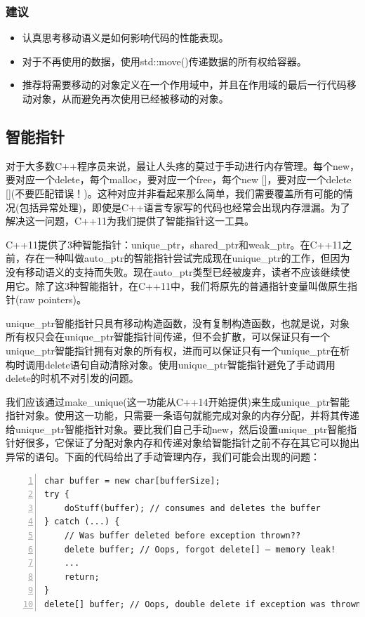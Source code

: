 \documentclass{ctexart}
\begin{document}
\subsubsection*{建议}
\begin{itemize}
	\item 认真思考移动语义是如何影响代码的性能表现。
	\item 对于不再使用的数据，使用std::move()传递数据的所有权给容器。
	\item 推荐将需要移动的对象定义在一个作用域中，并且在作用域的最后一行代码移动对象，从而避免再次使用已经被移动的对象。
\end{itemize}

\subsection{智能指针}

对于大多数C++程序员来说，最让人头疼的莫过于手动进行内存管理。每个new，要对应一个delete，每个malloc，要对应一个free，每个new []，要对应一个delete [](不要匹配错误！)。这种对应并非看起来那么简单，我们需要覆盖所有可能的情况(包括异常处理)，即使是C++语言专家写的代码也经常会出现内存泄漏。为了解决这一问题，C++11为我们提供了智能指针这一工具。

C++11提供了3种智能指针：unique\_ptr，shared\_ptr和weak\_ptr。在C++11之前，存在一种叫做auto\_ptr的智能指针尝试完成现在unique\_ptr的工作，但因为没有移动语义的支持而失败。现在auto\_ptr类型已经被废弃，读者不应该继续使用它。除了这3种智能指针，在C++11中，我们将原先的普通指针变量叫做原生指针(raw pointers)。

unique\_ptr智能指针只具有移动构造函数，没有复制构造函数，也就是说，对象所有权只会在unique\_ptr智能指针间传递，但不会扩散，可以保证只有一个unique\_ptr智能指针拥有对象的所有权，进而可以保证只有一个unique\_ptr在析构时调用delete语句自动清除对象。使用unique\_ptr智能指针避免了手动调用delete的时机不对引发的问题。

我们应该通过make\_unique(这一功能从C++14开始提供)来生成unique\_ptr智能指针对象。使用这一功能，只需要一条语句就能完成对象的内存分配，并将其传递给unique\_ptr智能指针对象。要比我们自己手动new，然后设置unique\_ptr智能指针好很多，它保证了分配对象内存和传递对象给智能指针之前不存在其它可以抛出异常的语句。下面的代码给出了手动管理内存，我们可能会出现的问题：


\begin{lstlisting}[language={[ANSI]C},keywordstyle=\color{blue!70},commentstyle=\color{red!50!green!50!blue!50},frame=shadowbox, rulesepcolor=\color{red!20!green!20!blue!20},basicstyle=\small,numbers=left, numberstyle=\tiny,breaklines=true]
char buffer = new char[bufferSize];  
try {  
	doStuff(buffer); // consumes and deletes the buffer  
} catch (...) {   
	// Was buffer deleted before exception thrown??  
	delete buffer; // Oops, forgot delete[] – memory leak!
	...
	return;
}  
delete[] buffer; // Oops, double delete if exception was thrown!
\end{lstlisting}
\end{document}
